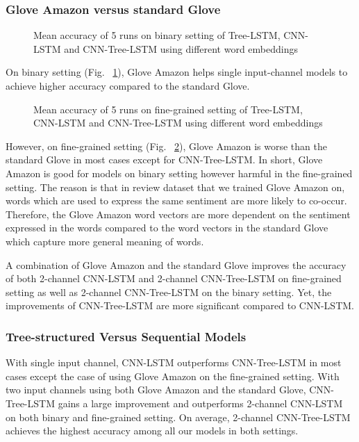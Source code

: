\subsubsection{Glove Amazon versus standard Glove}
\begin{figure} []
	\centering
	
	\caption[qwerty]{Mean accuracy of 5 runs on binary setting of Tree-LSTM, CNN-LSTM and CNN-Tree-LSTM using different word embeddings}
	\label{graph:binary}
\end{figure}
On binary setting (Fig. ~\ref{graph:binary}), Glove Amazon helps single input-channel models to achieve higher accuracy compared to the standard Glove.
\begin{figure} []
	\centering
	
	\caption[qwerty]{Mean accuracy of 5 runs on fine-grained setting of Tree-LSTM, CNN-LSTM and CNN-Tree-LSTM using different word embeddings}
	\label{graph:fine-grained}
\end{figure}
However, on fine-grained setting (Fig. ~\ref{graph:fine-grained}), Glove Amazon is worse than the standard Glove in most cases except for CNN-Tree-LSTM.
In short, Glove Amazon is good for models on binary setting however harmful in the fine-grained setting.
The reason is that in review dataset that we trained Glove Amazon on, words which are used to express the same sentiment are more likely to co-occur.
Therefore, the Glove Amazon word vectors are more dependent on the sentiment expressed in the words compared to the word vectors in the standard Glove which capture more general meaning of words.

A combination of Glove Amazon and the standard Glove improves the accuracy of both 2-channel CNN-LSTM and 2-channel CNN-Tree-LSTM on fine-grained setting as well as 2-channel CNN-Tree-LSTM on the binary setting.
Yet, the improvements of CNN-Tree-LSTM are more significant compared to CNN-LSTM.
\subsubsection{Tree-structured Versus Sequential Models}
With single input channel, CNN-LSTM outperforms CNN-Tree-LSTM in most cases except the case of using Glove Amazon on the fine-grained setting.
With two input channels using both Glove Amazon and the standard Glove, CNN-Tree-LSTM gains a large improvement and outperforms 2-channel CNN-LSTM on both binary and fine-grained setting.
On average, 2-channel CNN-Tree-LSTM achieves the highest accuracy among all our models in both settings.

